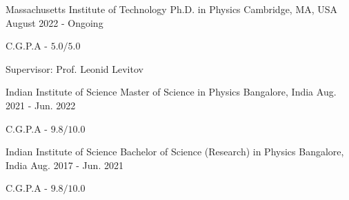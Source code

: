 

\begin{cventries}

    \cventry
	{Massachusetts Institute of Technology} %
	{Ph.D. in Physics} %
	{Cambridge, MA, USA} %
	{August 2022 - Ongoing} %
	{
	\begin{cvitems} %
		\item {C.G.P.A - $5.0/5.0$}\\
	\end{cvitems}
	Supervisor: Prof. Leonid Levitov
	}

    \cventry
	{Indian Institute of Science} %
	{Master of Science in Physics} %
	{Bangalore, India} %
	{Aug. 2021 - Jun. 2022} %
	{
	\begin{cvitems} %
		\item {C.G.P.A - $9.8/10.0$}
	\end{cvitems}
	}

  \cventry
    {Indian Institute of Science} %
    {Bachelor of Science (Research) in Physics} %
    {Bangalore, India} %
    {Aug. 2017 - Jun. 2021} %
    {
      \begin{cvitems} %
        \item {C.G.P.A - $9.8/10.0$}
      \end{cvitems}
    }




\end{cventries}
